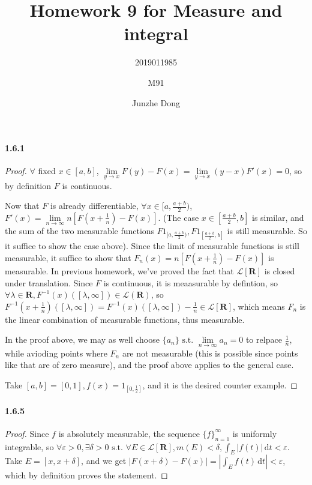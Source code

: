 \documentclass{article}
\title{Homework 9 for Measure and integral}
\author{2019011985\and M91\and Junzhe Dong}
\begin{document}
\maketitle

\newcommand{\st}{\text{ s.t. }}
\newcommand{\R}{\mathbf{R}}
\newcommand{\Leb}{\mathcal{L}}
\newcommand{\dd}{\,\mathrm{d}}
\paragraph{1.6.1}
\begin{proof}
$\forall$ fixed $x\in [a,b]$, $\lim\limits_{y\to x}F(y)-F(x)=\lim\limits_{y\to x}(y-x)F'(x)=0$, so by definition $F$ is continuous.

Now that $F$ is already differentiable, $\forall x\in [a,\frac{a+b}{2})$,$F'(x)=\lim\limits_{n\to\infty}n[F(x+\frac 1 n)-F(x)]$. (The case $x\in [\frac{a+b}{2},b]$ is similar, and the sum of the two measurable functions $F1_{[a,\frac{a+b}{2})},F1_{[\frac{a+b}{2},b]}$ is still measurable. So it suffice to show the case above). Since the limit of measurable functions is still measurable, it suffice to show that $F_n(x)=n[F(x+\frac 1 n)-F(x)]$ is measurable. In previous homework, we've proved the fact that $\Leb[\R]$ is closed under translation. Since $F$ is continuous, it is meaasurable by defintion, so $\forall \lambda\in\R, F^{-1}(x)([\lambda,\infty])\in\Leb(\R)$, so $F^{-1}(x+\frac 1 n)([\lambda,\infty])=F^{-1}(x)([\lambda,\infty])-\frac 1 n\in\Leb[\R]$, which means $F_n$ is the linear combination of measurable functions, thus measurable.

In the proof above, we may as well choose $\{a_n\}\st\lim\limits_{n\to\infty}a_n=0$ to relpace $\frac 1 n$, while avioding points where $F_n$ are not measurable (this is possible since points like that are of zero measure), and the proof above applies to the general case.

Take $[a,b]=[0,1],f(x)=1_{[0,\frac 1 2]}$, and it is the desired counter example. 
\end{proof}

\paragraph{1.6.5}
\begin{proof}
Since $f$ is absolutely measurable, the sequence $\{f\}_{n=1}^\infty$ is uniformly integrable, so $\forall \varepsilon>0,\exists \delta>0\st \forall E\in\Leb[\R],m(E)<\delta, \int_{E}|f(t)|\dd t<\varepsilon$. Take $E=[x,x+\delta]$, and we get $|F(x+\delta)-F(x)|=\left|\int_E f(t)\dd t\right|<\varepsilon$, which by definition proves the statement.
\end{proof}
\end{document}
